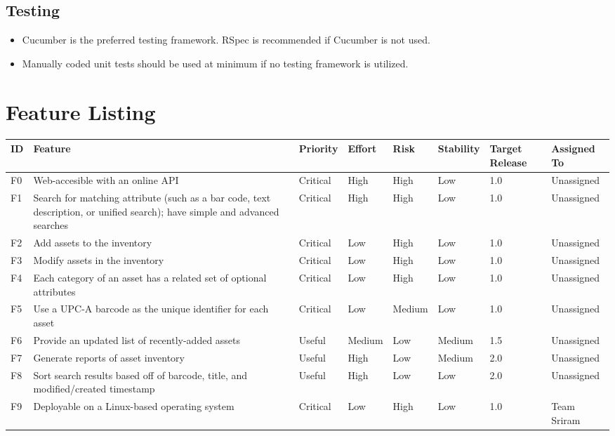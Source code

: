 \documentclass{article}
\begin{document}
\subsection{Testing}
\begin{itemize}
\item Cucumber is the preferred testing framework. RSpec is recommended if Cucumber is not used.
\item Manually coded unit tests should be used at minimum if no testing framework is utilized.
\end{itemize}

\section{Feature Listing}
\begin{tabular}{ | p{0.15in} | p{2.0in} | p{0.5in} | p{0.5in} | p{0.5in} | p{0.6in} | p{0.5in} | p{0.65in} | }
\hline
\textbf{ID} & \textbf{Feature} & \textbf{Priority} & \textbf{Effort} & \textbf{Risk} & \textbf{Stability} & \textbf{Target Release} & \textbf{Assigned To} \\
\hline
\hline
F0 & Web-accesible with an online API & Critical & High & High & Low & 1.0 & Unassigned \\
\hline
F1 & Search for matching attribute (such as a bar code, text description, or unified search); have simple and advanced searches & Critical & High & High & Low & 1.0 & Unassigned \\
\hline
F2 & Add assets to the inventory & Critical & Low & High & Low & 1.0 & Unassigned \\
\hline
F3 & Modify assets in the inventory & Critical & Low & High & Low & 1.0 & Unassigned \\
\hline
F4 & Each category of an asset has a related set of optional attributes & Critical & Low & High & Low & 1.0 & Unassigned \\
\hline
F5 & Use a UPC-A barcode as the unique identifier for each asset & Critical & Low & Medium & Low & 1.0 & Unassigned \\
\hline
F6 & Provide an updated list of recently-added assets & Useful & Medium & Low & Medium & 1.5 & Unassigned \\
\hline
F7 & Generate reports of asset inventory & Useful & High & Low & Medium & 2.0 & Unassigned \\
\hline
F8 & Sort search results based off of barcode, title, and modified/created timestamp & Useful & High & Low & Low & 2.0 & Unassigned \\
\hline
F9 & Deployable on a Linux-based operating system & Critical & Low & High & Low & 1.0 & Team Sriram \\
\hline
\end{tabular}\\
~\\
~\\
\end{document}
